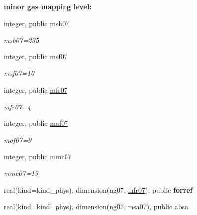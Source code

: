 \begin{Indent}\textbf{ minor gas mapping level\+:}\par
\begin{DoxyCompactItemize}
\item 
integer, public \hyperlink{group__module__radlw__kgbnn_gabba2139dfc5d8551f844f3809c28ce3c}{msb07}
\begin{DoxyCompactList}\small\item\em msb07=235 \end{DoxyCompactList}\item 
integer, public \hyperlink{group__module__radlw__kgbnn_ga9310f33501467fbadcf092d71559358b}{msf07}
\begin{DoxyCompactList}\small\item\em msf07=10 \end{DoxyCompactList}\item 
integer, public \hyperlink{group__module__radlw__kgbnn_ga0bd5d550553238ae13cbf57423d102c8}{mfr07}
\begin{DoxyCompactList}\small\item\em mfr07=4 \end{DoxyCompactList}\item 
integer, public \hyperlink{group__module__radlw__kgbnn_ga21ac454fe21fb07ee555b4106121b2ae}{maf07}
\begin{DoxyCompactList}\small\item\em maf07=9 \end{DoxyCompactList}\item 
integer, public \hyperlink{group__module__radlw__kgbnn_ga2d176bec938d9fdcc2369fda91308702}{mmc07}
\begin{DoxyCompactList}\small\item\em mmc07=19 \end{DoxyCompactList}\item 
real(kind=kind\+\_\+phys), dimension(ng07, \hyperlink{group__module__radlw__kgbnn_ga0bd5d550553238ae13cbf57423d102c8}{mfr07}), public {\bfseries forref}
\item 
real(kind=kind\+\_\+phys), dimension(ng07, \hyperlink{namespacemodule__radlw__kgb07_a0acb84a6b261fc00f1765707844c32f2}{msa07}), public \hyperlink{group__module__radlw__kgbnn_gaf106cf054f7496a092ceb0c399753a36}{absa}

\end{DoxyCompactItemize}
\end{Indent}
